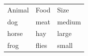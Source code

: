 \documentclass{article}
\begin{document}
\begin{tabular}{l!{:}ll}
Animal & Food & Size \\
dog & meat & medium \\
horse & hay & large \\
frog & flies & small \\
\end{tabular}
\end{document}
